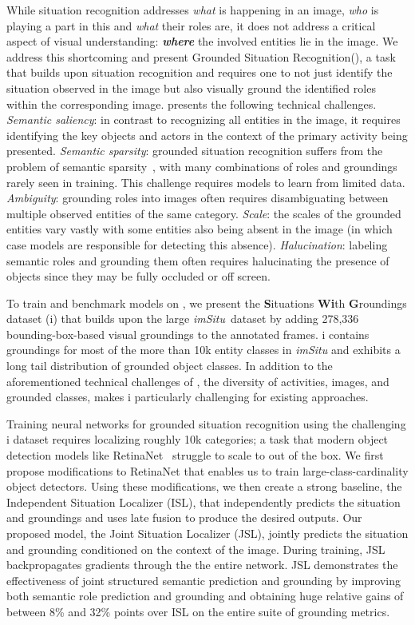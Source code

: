 \documentclass[runningheads]{llncs}
\newcommand{\dataset}{\mbox{\sc{SW}}i\mbox{\sc{G}}\xspace}
\newcommand{\imsitu}{\emph{imSitu}\xspace}
\newcommand{\task}{Grounded Situation Recognition\xspace}
\newcommand{\tasksmall}{\mbox{\sc{GSR}}\xspace}
\begin{document}
While situation recognition addresses \emph{what} is happening in an image, \emph{who} is playing a part in this and \emph{what} their roles are, it does not address a critical aspect of visual understanding: \emph{\textbf{where}} the involved entities lie in the image. We address this shortcoming and present \task (\tasksmall), a task that builds upon situation recognition and requires one to not just identify the situation observed in the image but also visually ground the identified roles within the corresponding image. \tasksmall presents the following technical challenges. \emph{Semantic saliency}: in contrast to recognizing all entities in the image, it requires identifying the key objects and actors in the context of the primary activity being presented. \emph{Semantic sparsity}: grounded situation recognition suffers from the problem of semantic sparsity~\cite{imsitucrf}, with many combinations of roles and groundings rarely seen in training. This challenge requires models to learn from limited data. \emph{Ambiguity}: grounding roles into images often requires disambiguating between multiple observed entities of the same category. \emph{Scale}: the scales of the grounded entities vary vastly with some entities also being absent in the image (in which case models are responsible for detecting this absence). \emph{Halucination}: labeling semantic roles and grounding them often requires halucinating the presence of objects since they may be fully occluded or off screen.

To train and benchmark models on \tasksmall, we present the \textbf{S}ituations \textbf{Wi}th \textbf{G}roundings dataset (\dataset) that builds upon the large \imsitu~dataset by adding 278,336 bounding-box-based visual groundings to the annotated frames. \dataset{} contains groundings for most of the more than 10k entity classes in \imsitu{} and exhibits a long tail distribution of grounded object classes. In addition to the aforementioned technical challenges of \tasksmall, the diversity of activities, images, and grounded classes, makes \dataset{} particularly challenging for existing approaches.


Training neural networks for grounded situation recognition using the challenging \dataset{} dataset requires localizing roughly 10k categories; a task that modern object detection models like RetinaNet~\cite{retinanet} struggle to scale to out of the box. We first propose modifications to RetinaNet that enables us to train large-class-cardinality object detectors. Using these modifications, we then create a strong baseline, the Independent Situation Localizer (ISL), that independently predicts the situation and groundings and uses late fusion to produce the desired outputs. Our proposed model, the Joint Situation Localizer (JSL), jointly predicts the situation and grounding conditioned on the context of the image. During training, JSL backpropagates gradients through the the entire network. JSL demonstrates the effectiveness of joint structured semantic prediction and grounding by improving both semantic role prediction and grounding and obtaining huge relative gains of between 8\% and 32\% points over ISL on the entire suite of grounding metrics.
\end{document}
